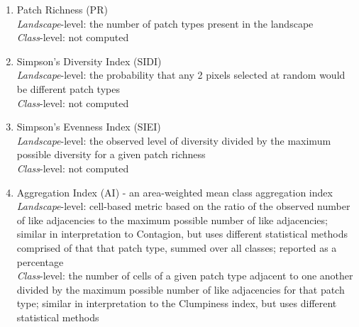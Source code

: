 \begin{enumerate}
	\item Patch Richness (PR)\\
	\emph{Landscape}-level: the number of patch types present in the landscape	\\
	\emph{Class}-level: not computed \\
	
	\item Simpson's Diversity Index (SIDI)\\
	\emph{Landscape}-level: the probability that any 2 pixels selected at random would be different patch types	\\
	\emph{Class}-level: not computed\\
	
	\item Simpson's Evenness Index (SIEI) \\
	\emph{Landscape}-level:  the observed level of diversity divided by the maximum possible diversity for a given patch richness 	\\
	\emph{Class}-level: not computed\\
	
	\item Aggregation Index (AI) - an area-weighted mean class aggregation index \\
	\emph{Landscape}-level: cell-based metric based on the ratio of the observed number of like adjacencies to the maximum possible number of like 
adjacencies; similar in interpretation to Contagion, but uses different statistical methods
comprised of that that patch type, summed over all classes; reported as a percentage	\\
	\emph{Class}-level: the number of cells of a given patch type adjacent to one another divided by the maximum possible number of like 
adjacencies for that patch type; similar in interpretation to the Clumpiness index, but uses different statistical methods	\\
\end{enumerate}




